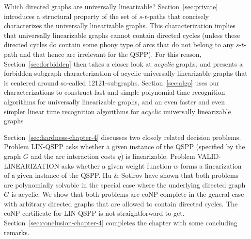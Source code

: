 Which directed graphs are universally linearizable?
Section~\ref{sec:private} introduces a structural property of the set of $s$-$t$-paths that
concisely characterizes the universally linearizable graphs.
This characterization implies that universally linearizable graphs cannot contain directed cycles
(unless these directed cycles do contain some phony type of arcs that do not belong to 
any $s$-$t$-path and that hence are irrelevant for the QSPP).
For this reason, Section~\ref{sec:forbidden} then takes a closer look at \emph{acyclic} graphs, 
and presents a forbidden subgraph characterization of acyclic universally linearizable graphs 
that is centered around so-called 12121-subgraphs.
Section~\ref{sec:algo} uses our characterizations to construct fast and simple polynomial time 
recognition algorithms for universally linearizable graphs, and an even faster and even simpler
linear time recognition algorithms for \emph{acyclic} universally linearizable graphs

Section~\ref{sec:hardness-chapter-4} discusses two closely related decision problems.
Problem LIN-QSPP asks whether a given instance of the QSPP (specified by the 
graph $G$ and the arc interaction costs $q$) is linearizable.
Problem VALID-LINEARIZATION asks whether a given weight function $w$ forms a linearization
of a given instance of the QSPP. 
Hu \& Sotirov \cite{huSo2021} have shown that both problems are polynomially solvable 
in the special case where the underlying directed graph $G$ is acyclic.
We show that both problems are coNP-complete in the general case with arbitrary directed 
graphs that are allowed to contain directed cycles.
The coNP-certificate for LIN-QSPP is not straightforward to get.
Section~\ref{sec:conclusion-chapter-4} completes the chapter with some concluding remarks.


\medskip
